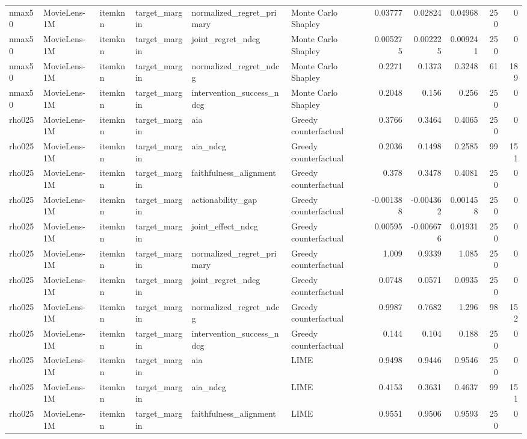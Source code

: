 \begin{table}[t]
{\begin{tabular}{llllllrrrrr}
nmax50 & MovieLens-1M & itemknn & target\_margin & normalized\_regret\_primary & Monte Carlo Shapley & 0.03777 & 0.02824 & 0.04968 & 250 & 0 \\
nmax50 & MovieLens-1M & itemknn & target\_margin & joint\_regret\_ndcg & Monte Carlo Shapley & 0.005275 & 0.002225 & 0.009241 & 250 & 0 \\
nmax50 & MovieLens-1M & itemknn & target\_margin & normalized\_regret\_ndcg & Monte Carlo Shapley & 0.2271 & 0.1373 & 0.3248 & 61 & 189 \\
nmax50 & MovieLens-1M & itemknn & target\_margin & intervention\_success\_ndcg & Monte Carlo Shapley & 0.2048 & 0.156 & 0.256 & 250 & 0 \\
rho025 & MovieLens-1M & itemknn & target\_margin & aia & Greedy counterfactual & 0.3766 & 0.3464 & 0.4065 & 250 & 0 \\
rho025 & MovieLens-1M & itemknn & target\_margin & aia\_ndcg & Greedy counterfactual & 0.2036 & 0.1498 & 0.2585 & 99 & 151 \\
rho025 & MovieLens-1M & itemknn & target\_margin & faithfulness\_alignment & Greedy counterfactual & 0.378 & 0.3478 & 0.4081 & 250 & 0 \\
rho025 & MovieLens-1M & itemknn & target\_margin & actionability\_gap & Greedy counterfactual & -0.001388 & -0.004362 & 0.001458 & 250 & 0 \\
rho025 & MovieLens-1M & itemknn & target\_margin & joint\_effect\_ndcg & Greedy counterfactual & 0.00595 & -0.006676 & 0.01931 & 250 & 0 \\
rho025 & MovieLens-1M & itemknn & target\_margin & normalized\_regret\_primary & Greedy counterfactual & 1.009 & 0.9339 & 1.085 & 250 & 0 \\
rho025 & MovieLens-1M & itemknn & target\_margin & joint\_regret\_ndcg & Greedy counterfactual & 0.0748 & 0.0571 & 0.0935 & 250 & 0 \\
rho025 & MovieLens-1M & itemknn & target\_margin & normalized\_regret\_ndcg & Greedy counterfactual & 0.9987 & 0.7682 & 1.296 & 98 & 152 \\
rho025 & MovieLens-1M & itemknn & target\_margin & intervention\_success\_ndcg & Greedy counterfactual & 0.144 & 0.104 & 0.188 & 250 & 0 \\
rho025 & MovieLens-1M & itemknn & target\_margin & aia & LIME & 0.9498 & 0.9446 & 0.9546 & 250 & 0 \\
rho025 & MovieLens-1M & itemknn & target\_margin & aia\_ndcg & LIME & 0.4153 & 0.3631 & 0.4637 & 99 & 151 \\
rho025 & MovieLens-1M & itemknn & target\_margin & faithfulness\_alignment & LIME & 0.9551 & 0.9506 & 0.9593 & 250 & 0 \\

\end{tabular}}
\end{table}

